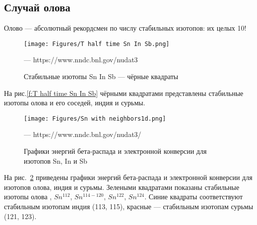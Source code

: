 \documentclass[a5paper,openany]{book}
\begin{document}
\subsection{Случай олова} \label{SnIsotopes}	
Олово --- абсолютный рекордсмен по числу стабильных изотопов: их целых 10!

\begin{figure}[ht] 
	\centering\small
	\unitlength=1mm
	\texttt{[image: Figures/T half time Sn In Sb.png]} 
	\caption{Стабильные изотопы Sn In Sb --- чёрные квадраты} --- https://www.nndc.bnl.gov/nudat3 
	\label{f:T half time Sn In Sb}
\end{figure}

На рис.\ref{f:T half time  Sn In Sb} чёрными квадратами представлены стабильные изотопы олова и его соседей, индия и сурьмы.

\begin{figure}[ht] 
	\centering\small
	\unitlength=1mm
	\texttt{[image: Figures/Sn with neighbors1d.png]} 
	\caption{Графики энергий бета-распада и электронной конверсии для изотопов Sn, In  и Sb} --- https://www.nndc.bnl.gov/nudat3/
	\label{f:Sn with neighbors1d}
\end{figure}

На рис.~\ref{f:Sn with neighbors1d} приведены графики энергий бета-распада и электронной конверсии для изотопов олова, индия и сурьмы. Зелеными квадратами показаны стабильные изотопы олова , $Sn^{112}$, $Sn^{114-120}$, $Sn^{122}$, $Sn^{124}$. Синие квадраты соответствуют стабильным изотопам индия (113, 115), красные --- стабильным  изотопам сурьмы (121, 123).




\end{document}
